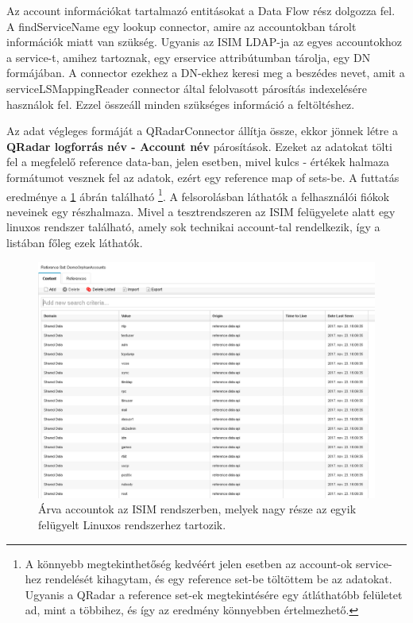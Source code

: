 Az account információkat tartalmazó entitásokat a Data Flow rész dolgozza fel. A findServiceName egy lookup connector, amire az accountokban tárolt információk miatt van szükség. Ugyanis az ISIM LDAP-ja az egyes accountokhoz a service-t, amihez tartoznak, egy erservice attribútumban tárolja, egy DN formájában.\cite{ldapdn} A connector ezekhez a DN-ekhez keresi meg a beszédes nevet, amit a serviceLSMappingReader connector által felolvasott párosítás indexelésére használok fel. Ezzel összeáll minden szükséges információ a feltöltéshez.

Az adat végleges formáját a QRadarConnector állítja össze, ekkor jönnek létre a \textbf{QRadar logforrás név - Account név } párosítások. Ezeket az adatokat tölti fel a megfelelő reference data-ban, jelen esetben, mivel kulcs - értékek halmaza formátumot vesznek fel az adatok, ezért egy reference map of sets-be. A futtatás eredménye a \ref{fig:orphanaccountresult} ábrán található
\footnote{A könnyebb megtekinthetőség kedvéért jelen esetben az account-ok service-hez rendelését kihagytam, és egy reference set-be töltöttem be az adatokat. Ugyanis a QRadar a reference set-ek megtekintésére egy átláthatóbb felületet ad, mint a többihez, és így az eredmény könnyebben értelmezhető.}. 
A felsorolásban láthatók a felhasználói fiókok neveinek egy részhalmaza. Mivel a tesztrendszeren az ISIM felügyelete alatt egy linuxos rendszer található, amely sok technikai account-tal rendelkezik, így a listában főleg ezek láthatók.

\begin{figure}[h]
	\centering
	\includegraphics[width=0.9\linewidth]{figures/conn_test/orphanAccountResult}
	\caption{Árva accountok az ISIM rendszerben, melyek nagy része az egyik felügyelt Linuxos rendszerhez tartozik.}
	\label{fig:orphanaccountresult}
\end{figure}

